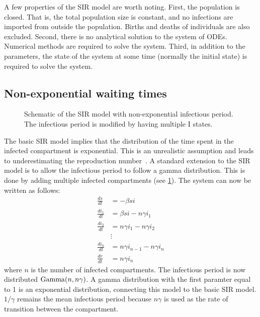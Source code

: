 \documentclass[thesis.tex]{subfiles}
\begin{document}
A few properties of the SIR model are worth noting.
First, the population is closed.
That is, the total population size is constant, and no infections are imported from outside the population.
Births and deaths of individuals are also excluded.
Second, there is no analytical solution to the system of ODEs.
Numerical methods are required to solve the system.
Third, in addition to the parameters, the state of the system at some time (normally the initial state) is required to solve the system.


\subsection{Non-exponential waiting times} \label{SEIR:sec:non-exponential}
\begin{figure}[h]
  \caption[The SIR model with non-exponential infectious period]{Schematic of the SIR model with non-exponential infectious period. The infectious period is modified by having multiple I states.}
  \label{SEIR:fig:SIR-gamma}
\end{figure}

The basic SIR model implies that the distribution of the time spent in the infected compartment is exponential.
This is an unrealistic assumption and leads to underestimating the reproduction number~\autocites{lloydRealistic}{wearingAppropriate}.
A standard extension to the SIR model is to allow the infectious period to follow a gamma distribution.
This is done by adding multiple infected compartments (see \cref{SEIR:fig:SIR-gamma}).
The system can now be written as follows:
\begin{align}
\frac{ds}{dt} &= -\beta si \\
\frac{di_1}{dt} &= \beta si - n\gamma i_1 \\
\frac{di_2}{dt} &= n\gamma i_1 - n \gamma i_2 \\
&\vdots \nonumber \\
\frac{di_n}{dt} &= n\gamma i_{n-1} - n \gamma i_n \\
\frac{dr}{dt} &= n\gamma i_n
\end{align}
where $n$ is the number of infected compartments.
The infectious period is now distributed $\operatorname{Gamma}(n, n\gamma)$.
A gamma distribution with the first paramter equal to 1 is an exponential distribution, connecting this model to the basic SIR model.
$1/\gamma$ remains the mean infectious period because $n\gamma$ is used as the rate of transition between the compartment.
\end{document}
